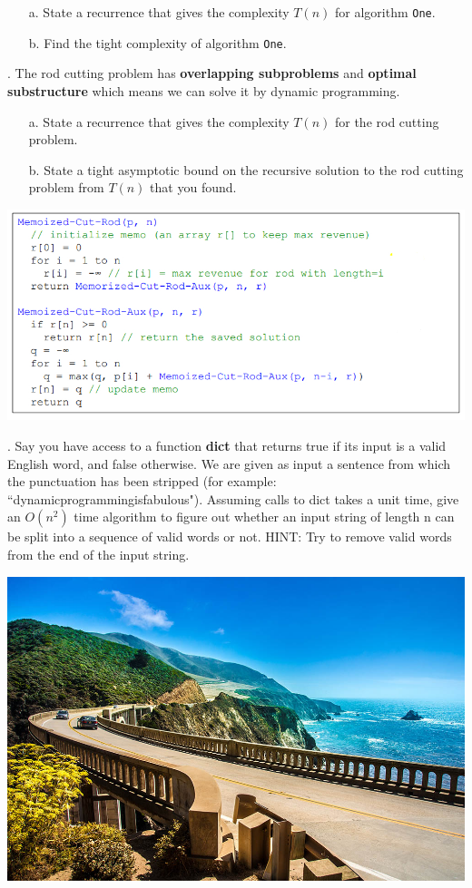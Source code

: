 \documentclass[12pt]{article}
\begin{document}
\begin{enumerate}
\item [a.] State a recurrence that gives the complexity $T(n)$ for algorithm \texttt{One}.


\item [b.] Find the tight complexity of algorithm \texttt{One}.

\end{enumerate}
\newpage
{}. The rod cutting problem has \textbf{overlapping subproblems} 
and \textbf{optimal substructure} which means we can solve it by dynamic programming.
\begin{enumerate}
    \item [a.] State a recurrence that gives the complexity $T(n)$ for the rod cutting problem.
    
    
    \item [b.] State a tight asymptotic bound on the recursive solution to the rod cutting problem from $T(n)$ that you found.
    
    \end{enumerate}
\centerline{\includegraphics[scale = 2]{rodcutting.jpg}}
\newpage
{}. Say you have access to a function \textbf{dict} that returns true 
if its input is a valid English word, and false otherwise. We are given 
as input a sentence from which the punctuation has been
stripped (for example: ``dynamicprogrammingisfabulous"). 
Assuming calls to dict takes a unit time, give an $O(n^2)$ time 
algorithm to figure out whether an input string of length n can be
split into a sequence of valid words or not. 
HINT: Try to remove valid words from the end of the input string.
\newpage
\noindent \centerline{\includegraphics[scale = 1.25]{brix.jpg}}\\
\end{document}
